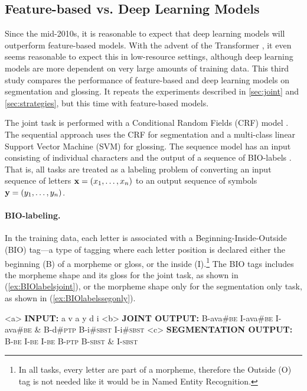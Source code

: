 \subsection{Feature-based vs. Deep Learning Models}
\label{sec:CRFvNN}

Since the mid-2010s, it is reasonable to expect that deep learning models will outperform feature-based models. With the advent of the Transformer \citep{vaswani_attention_2017}, it even seems reasonable to expect this in low-resource settings, although deep learning models are more dependent on very large amounts of training data. This third study compares the performance of feature-based and deep learning models on segmentation and glossing. It repeats the experiments described in \autoref{sec:joint} and \autoref{sec:strategies}, but this time with feature-based models.

The joint task is performed with a Conditional Random Fields (CRF) model \citep{lafferty_conditional_2001}. The sequential approach uses the CRF for segmentation and a multi-class linear Support Vector Machine (SVM) for glossing.
The sequence model has an input consisting of individual characters and the output of a sequence of BIO-labels \citep{ramshaw1999}. That is, all tasks are treated as a labeling problem of converting an input sequence of letters $\mathbf{x} = (x_1, \ldots, x_n)$ to an output sequence of symbols $\mathbf{y} = (y_1, \ldots, y_n)$.  

\paragraph{BIO-labeling.} 
In the training data, each letter is associated with a Beginning-Inside-Outside (BIO) tag---a type of tagging where each letter position is declared either the beginning (B) of a morpheme or gloss, or the inside (I).\footnote{In all tasks, every letter are part of a morpheme, therefore the Outside (O) tag is not needed like it would be in Named Entity Recognition.} The BIO tags includes the morpheme shape and its gloss for the joint task, as shown in (\ref{ex:BIOlabelsjoint}), or the morpheme shape only for the segmentation only task, as shown in (\ref{ex:BIOlabelssegonly}). 

\pex   
\label{ex:BIOlabels}
\a<a> {\bf INPUT:} \hspace{35 mm}  a \hspace{10 mm}  v \hspace{10 mm} a \hspace{10 mm} y \hspace{10 mm} d \hspace{10 mm} i
\a<b> {\bf JOINT OUTPUT:} \hspace{1 mm} B-ava\#\textsc{be}  I-ava\#\textsc{be} I-ava\#\textsc{be} & B-d\#\textsc{ptp} B-i\#\textsc{sbst} I-i\#\textsc{sbst}
\label{ex:BIOlabelsjoint}
\a<c> {\bf SEGMENTATION OUTPUT:} \hspace{1 mm} B-\textsc{be} I-\textsc{be} I-\textsc{be} B-\textsc{ptp} B-\textsc{sbst} & I-\textsc{sbst}
\label{ex:BIOlabelssegonly}
\xe


